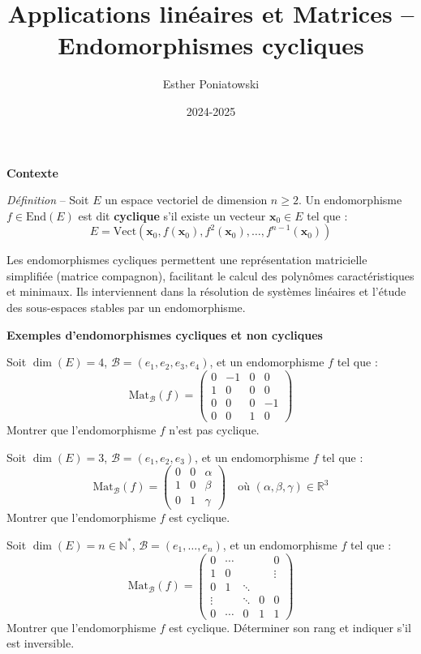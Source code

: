 \documentclass[10pt,a4paper]{article}
\title{Applications linéaires et Matrices -- Endomorphismes cycliques}
\author{Esther Poniatowski}
\date{2024-2025}
\newcommand{\Mat}[2]{\mathrm{Mat}_{#1}(#2)}
\begin{document}
\textbf{Contexte}

\textit{Définition} -- Soit $E$ un espace vectoriel de dimension $n \geq 2$. Un endomorphisme $f \in
\mathrm{End}(E)$ est dit \textbf{cyclique} s'il existe un vecteur $\mathbf{x}_0 \in E$ tel que :
\[
E = \mathrm{Vect}(\mathbf{x}_0, f(\mathbf{x}_0), f^2(\mathbf{x}_0), \dots, f^{n-1}(\mathbf{x}_0))
\]

Les endomorphismes cycliques permettent une représentation matricielle simplifiée (matrice
compagnon), facilitant le calcul des polynômes caractéristiques et minimaux. Ils interviennent dans
la résolution de systèmes linéaires et l'étude des sous-espaces stables par un endomorphisme.

\bigskip
\textbf{Exemples d'endomorphismes cycliques et non cycliques}

\q Soit $\dim(E) = 4$, $\mathscr{B} = (e_1, e_2, e_3, e_4)$, et un endomorphisme $f$ tel que :
\[
\Mat{\mathscr{B}}{f} =
\begin{pmatrix}
0 & -1 & 0 & 0\\
1 & 0 & 0 & 0\\
0 & 0 & 0 & -1\\
0 & 0 & 1 & 0
\end{pmatrix}
\]
Montrer que l'endomorphisme $f$ n'est pas cyclique.

\q Soit $\dim(E) = 3$, $\mathscr{B} = (e_1, e_2, e_3)$, et un endomorphisme $f$ tel que :
\[
\Mat{\mathscr{B}}{f} =
\begin{pmatrix}
0 & 0 & \alpha\\
1 & 0 & \beta\\
0 & 1 & \gamma
\end{pmatrix}
\quad \text{où } (\alpha, \beta, \gamma) \in \mathbb{R}^3
\]
Montrer que l'endomorphisme $f$ est cyclique.

\q Soit $\dim(E) = n \in \mathbb{N}^*$, $\mathscr{B} = (e_1, \dots, e_n)$, et un endomorphisme $f$
tel que :
\[
\Mat{\mathscr{B}}{f} =
\begin{pmatrix}
0 & \cdots & & & 0\\
1 & 0 & & & \vdots\\
0 & 1 & \ddots & & \\
\vdots & & \ddots & 0 & 0\\
0 & \cdots & 0 & 1 & 1
\end{pmatrix}
\]
Montrer que l'endomorphisme $f$ est cyclique. Déterminer son rang et indiquer s'il est inversible.
\end{document}
